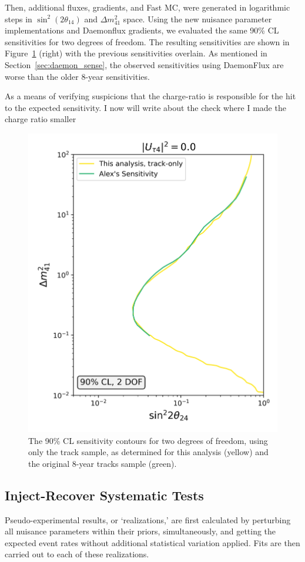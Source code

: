 \documentclass[main.tex]{subfiles}
\begin{document}
Then, additional fluxes, gradients, and Fast MC, were generated in logarithmic steps in $\sin^{2}(2\theta_{14})$ and $\Delta m_{41}^{2}$ space.
Using the new nuisance parameter implementations and Daemonflux gradients, we evaluated the same 90\% CL sensitivities for two degrees of freedom.
The resulting sensitivities are shown in Figure~\ref{fig:comparison} (right) with the previous sensitivities overlain. 
As mentioned in Section~\ref{sec:daemon_sense}, the observed sensitivities using DaemonFlux are worse than the older 8-year sensitivities. 

As a means of verifying suspicions that the charge-ratio is responsible for the hit to the expected sensitivity. I now will write about the check where I made the charge ratio smaller 

\begin{figure}
    \centering
    \includegraphics[width=0.6\linewidth]{figures/track_asimov_oldairs_Realization_Asimov_sterile_0_cl0.9_dof2.png}
    \caption{The 90\% CL sensitivity contours for two degrees of freedom, using only the track sample, as determined for this analysis (yellow) and the original 8-year tracks sample (green).}\label{fig:comparison}
\end{figure}

\subsection{Inject-Recover Systematic Tests}

Pseudo-experimental results, or `realizations,' are first calculated by perturbing all nuisance parameters within their priors, simultaneously, and getting the expected event rates without additional statistical variation applied. 
Fits are then carried out to each of these realizations.
\end{document}
